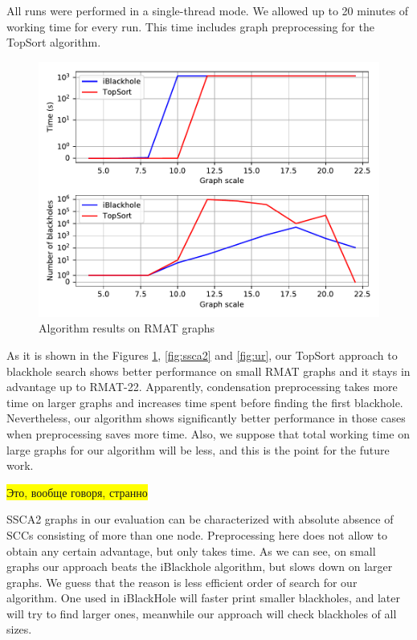 \documentclass{svproc}
\newcommand{\FIXME}[1]{ %
	\colorbox{yellow}{#1}
}
\newcommand{\FIXME}[1]{ %
}
\begin{document}
All runs were performed in a single-thread mode. We allowed up to 20 minutes of working time for every run. This time includes graph preprocessing for the TopSort algorithm.

\begin{figure}[H]
	\includegraphics[width=\linewidth]{rmat.pdf}
	\caption{Algorithm results on RMAT graphs}
	\label{fig:rmat}
\end{figure}

As it is shown in the Figures \ref{fig:rmat}, \ref{fig:ssca2} and \ref{fig:ur}, our TopSort approach to blackhole search shows better performance on small RMAT graphs and it stays in advantage up to RMAT-22. Apparently, condensation preprocessing takes more time on larger graphs and increases time spent before finding
the first blackhole. Nevertheless, our algorithm shows significantly better performance in those cases when preprocessing saves more time. Also, we suppose
that total working time on large graphs for our algorithm will be less, and this is the point for the future work.

\FIXME{Это, вообще говоря, странно}
SSCA2 graphs in our evaluation can be characterized with absolute absence of SCCs consisting of more than one node. Preprocessing here does not allow to obtain any
certain advantage, but only takes time. As we can see, on small graphs our approach beats the iBlackhole algorithm, but slows down on larger graphs.
We guess that the reason is less efficient order of search for our algorithm. One used in iBlackHole will faster print smaller blackholes, and later will try
to find larger ones, meanwhile our approach will check blackholes of all sizes.
\end{document}
